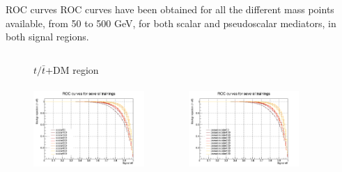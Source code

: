\documentclass[8pt]{beamer}
\begin{document}
\begin{frame}{ROC curves}
\justifying
\alert{ROC curves have been obtained} for all the different mass points available, from 50 to 500 GeV, for both scalar and pseudoscalar mediators, in both signal regions. \vfill
\vspace{-5pt}

\begin{figure}[htbp]
\centering
\begin{columns}
\begin{column}{1.09\textwidth}
\begin{block}{\centering $t/\bar t$+DM region}\end{block} \vspace{10pt}
\end{column}
\end{columns} \vspace{-16pt}

\begin{columns}
\begin{column}[b]{.50\textwidth}
\begin{center}
\includegraphics[width=4.2cm, height=3.2cm]{figs/groupedROC_scalar_ST.png}
\end{center}
\end{column} \hfill
\begin{column}[b]{.50\textwidth}
\begin{center}
\includegraphics[width=4.2cm, height=3.2cm]{figs/groupedROC_pseudo_ST.png}
\end{center}
\end{column} \hfill
\end{columns} \vfill
\vspace{-5pt}


\end{figure}
\end{frame}
\end{document}
